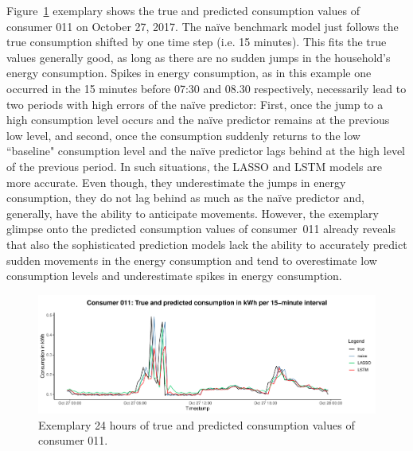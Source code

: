 Figure~\ref{Fig:glimpse_predcons} exemplary shows the true and predicted consumption values of consumer 011 on October 27, 2017. The na\"ive benchmark model just follows the true consumption shifted by one time step (i.e. 15 minutes). This fits the true values generally good, as long as there are no sudden jumps in the household's energy consumption. Spikes in energy consumption, as in this example one occurred in the 15 minutes before 07:30 and 08.30 respectively, necessarily lead to two periods with high errors of the na\"ive predictor: First, once the jump to a high consumption level occurs and the na\"ive predictor remains at the previous low level, and second, once the consumption suddenly returns to the low ``baseline" consumption level and the na\"ive predictor lags behind at the high level of the previous period. In such situations, the LASSO and LSTM models are more accurate. Even though, they underestimate the jumps in energy consumption, they do not lag behind as much as the na\"ive predictor and, generally, have the ability to anticipate movements. However, the exemplary glimpse onto the predicted consumption values of consumer~011 already reveals that also the sophisticated prediction models lack the ability to accurately predict sudden movements in the energy consumption and tend to overestimate low consumption levels and underestimate spikes in energy consumption.
%
\begin{figure}[htbp]
    \centering
    \includegraphics[width=\textwidth]{thesis/graphs/evaluation/c011_pred_cons.pdf}
    \caption[Exemplary 24 hours of true and predicted consumption values]{Exemplary 24 hours of true and predicted consumption values of consumer 011. \quantnet\href{}{}}
    \label{Fig:glimpse_predcons}
\end{figure}
%


